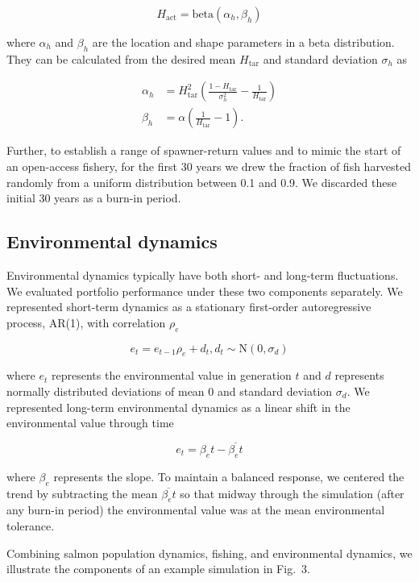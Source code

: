 \[H_{\mathrm{act}} = \mathrm{beta}(\alpha_h, \beta_h)\]

\noindent where $\alpha_h$ and $\beta_h$ are the location and shape parameters in a beta distribution. They can be calculated from the desired mean $H_{\mathrm{tar}}$ and standard deviation $\sigma_h$ as \citep[p.~97]{morgan1990}

\[\begin{aligned}
  \alpha_h &= H_{\mathrm{tar}}^2
                \left(
                \frac{1 - H_{\mathrm{tar}}}{\sigma_h^2} - \frac{1}{H_{\mathrm{tar}}}
                \right)\\
   \beta_h &= \alpha \left({\frac{1}{H_{\mathrm{tar}}} - 1}\right).\end{aligned}\]

\noindent Further, to establish a range of spawner-return values and to mimic the start of an open-access fishery, for the first 30 years we drew the fraction of fish harvested randomly from a uniform distribution between 0.1 and 0.9. We discarded these initial 30 years as a burn-in period.

\subsection{Environmental dynamics}

Environmental dynamics typically have both short- and long-term fluctuations. We evaluated portfolio performance under these two components separately. We represented short-term dynamics as a stationary first-order autoregressive process, AR(1), with correlation $\rho_e$

\[e_t = e_{t-1} \rho_e + d_t, d_t \sim \mathrm{N}(0, \sigma_d)\]

\noindent where $e_t$ represents the environmental value in generation $t$ and $d$ represents normally distributed deviations of mean 0 and standard deviation $\sigma_d$. We represented long-term environmental dynamics as a linear shift in the environmental value through time

\[e_t = \beta_e t - \overline{\beta_e t}\]

\noindent where $\beta_e$ represents the slope. To maintain a balanced response, we centered the trend by subtracting the mean $\overline{\beta_e t}$ so that midway through the simulation (after any burn-in period) the environmental value was at the mean environmental tolerance.

Combining salmon population dynamics, fishing, and environmental dynamics, we illustrate the components of an example simulation in Fig.~3.

